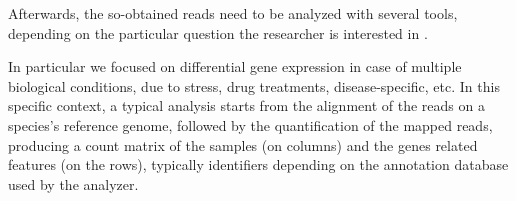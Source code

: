 Afterwards, the so-obtained reads need to be analyzed with several tools, depending on the particular question the researcher is interested in \cite{Pepke2009, Oshlack2010}.


In particular we focused on differential gene expression in case of multiple biological conditions, due to stress, drug treatments, disease-specific, etc. In this specific context, a typical analysis starts from the alignment of the reads on a species's reference genome, followed by the quantification of the mapped reads, producing a count matrix of the samples (on columns) and the genes related features (on the rows), typically identifiers depending on the annotation database used by the analyzer.


